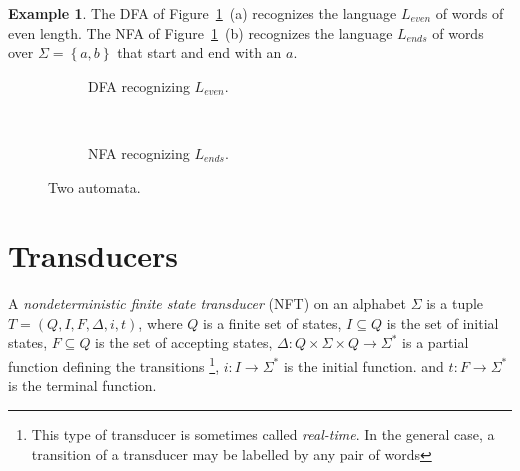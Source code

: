 \documentclass[12pt]{report}
\theoremstyle{definition}
\newtheorem{xmp}{Example}[section]
\theoremstyle{remark}
\begin{document}
\begin{xmp}

The DFA of Figure~\ref{nfas}~(a) recognizes the language $L_{even}$ of words of even length.
The NFA of Figure~\ref{nfas}~(b) recognizes the language $L_{ends}$ of words over $\Sigma=\left\{ a,b \right\}$ that start and end with an $a$.

\begin{figure}[t]
        \centering
        \begin{subfigure}[b]{0.4\textwidth}
        	\centering
{}
\caption{DFA recognizing $L_{even}$.}
        \end{subfigure}
        ~
        \begin{subfigure}[b]{0.4\textwidth}
        \centering
{}
\caption{NFA recognizing $L_{ends}$.}
        \end{subfigure}
        \caption{Two automata.}
        \label{nfas}
\end{figure}


\end{xmp}


\section{Transducers}
A \emph{nondeterministic finite state transducer} (NFT) on an alphabet $\Sigma$ is a tuple $T=(Q,I,F,\Delta,i,t)$,
where $Q$ is a finite set of states,
$I\subseteq Q$ is the set of initial states,
$F\subseteq Q$ is the set of accepting states,
$\Delta: Q\times\Sigma\times Q\rightarrow \Sigma^\ast$ is a partial function defining the transitions \footnote{This type of transducer is sometimes called \emph{real-time}\cite{sakarovitch09}. In the general case, a transition of a transducer may be labelled by any pair of words},
$i:I\rightarrow \Sigma^\ast$ is the initial function.
and $t:F\rightarrow \Sigma^\ast$ is the terminal function.
\end{document}
